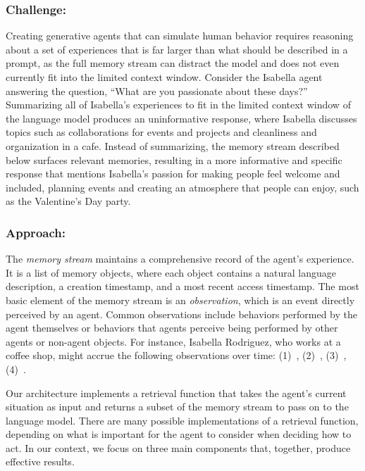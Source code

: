 \subsubsection*{Challenge:} Creating generative agents that can simulate human behavior requires reasoning about a set of experiences that is far larger than what should be described in a prompt, as the full memory stream can distract the model and does not even currently fit into the limited context window. Consider the Isabella agent answering the question, ``What are you passionate about these days?'' Summarizing all of Isabella's experiences to fit in the limited context window of the language model produces an uninformative response, where Isabella discusses topics such as collaborations for events and projects and cleanliness and organization in a cafe. Instead of summarizing, the memory stream described below surfaces relevant memories, resulting in a more informative and specific response that mentions Isabella's passion for making people feel welcome and included, planning events and creating an atmosphere that people can enjoy, such as the Valentine's Day party.

\subsubsection*{Approach:}
The \textit{memory stream} maintains a comprehensive record of the agent's experience. It is a list of memory objects, where each object contains a natural language description, a creation timestamp, and a most recent access timestamp. The most basic element of the memory stream is an \textit{observation}, which is an event directly perceived by an agent. Common observations include behaviors performed by the agent themselves or behaviors that agents perceive being performed by other agents or non-agent objects. For instance, Isabella Rodriguez, who works at a coffee shop, might accrue the following observations over time: (1)~, (2)~, (3)~, (4)~.

Our architecture implements a retrieval function that takes the agent's current situation as input and returns a subset of the memory stream to pass on to the language model. There are many possible implementations of a retrieval function, depending on what is important for the agent to consider when deciding how to act. In our context, we focus on three main components that, together, produce effective results.

